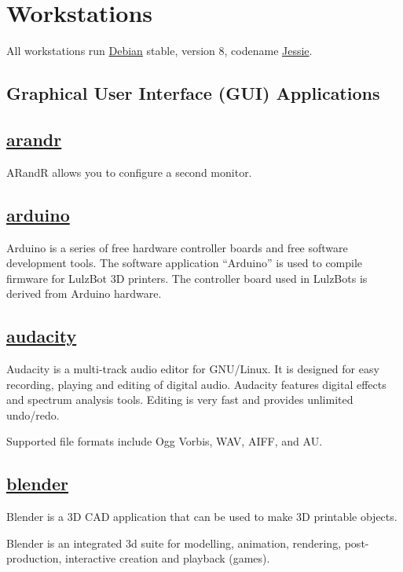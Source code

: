 \section{Workstations}
All workstations run \href{http://www.debian.org/}{Debian} stable, version 8,
codename \href{https://www.debian.org/releases/jessie/}{Jessie}.

\subsection{Graphical User Interface (GUI) Applications}

\subsection{\href{http://christian.amsuess.com/tools/arandr/}{arandr}}

ARandR allows you to configure a second monitor.

\subsection{\href{http://www.arduino.cc}{arduino}}

Arduino is a series of free hardware controller boards and free software
development tools. The software application ``Arduino'' is used to compile
firmware for LulzBot 3D printers. The controller board used in LulzBots is
derived from Arduino hardware.

\subsection{\href{http://audacity.sourceforge.net/}{audacity}}

 Audacity is a multi-track audio editor for GNU/Linux.
 It is designed for easy recording, playing and editing of
 digital audio.  Audacity features digital effects and spectrum
 analysis tools.  Editing is very fast and provides unlimited
 undo/redo.
 
 Supported file formats include Ogg Vorbis, WAV, AIFF, and AU.

\subsection{\href{http://www.blender.org/}{blender}}

Blender is a 3D CAD application that can be used to make 3D printable objects.

 Blender is an integrated 3d suite for modelling, animation, rendering,
 post-production, interactive creation and playback (games).

